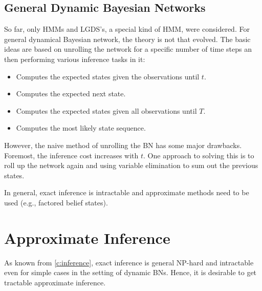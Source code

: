	\section{General Dynamic Bayesian Networks}
		So far, only HMMs and LGDS's, a special kind of HMM, were considered. For general dynamical Bayesian network, the theory is not that evolved. The basic ideas are based on unrolling the network for a specific number of time steps an then performing various inference tasks in it:
		\begin{itemize}
			\item {}  Computes the expected states given the observations until \(t\).
			\item {} Computes the expected next state.
			\item {}  Computes the expected states given all observations until \(T\).
			\item {}        Computes the most likely state sequence.
		\end{itemize}
		However, the naive method of unrolling the BN has some major drawbacks. Foremost, the inference cost increases with \(t\). One approach to solving this is to roll up the network again and using variable elimination to sum out the previous states.

		In general, exact inference is intractable and approximate methods need to be used (e.g., factored belief states).


\chapter{Approximate Inference}
	\label{c:approxInference}

	As known from \autoref{c:inference}, exact inference is general NP-hard and intractable even for simple cases in the setting of dynamic BNs. Hence, it is desirable to get tractable approximate inference.

